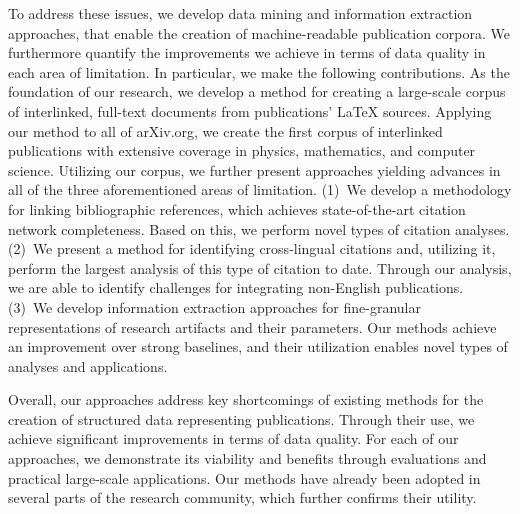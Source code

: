 To address these issues, we develop %
data mining and information extraction approaches, that enable the creation of machine-readable publication corpora.
We furthermore quantify the improvements we achieve in terms of data quality in each area of limitation.
%
In particular, we make the following contributions.
As the foundation of our research, we develop a method for creating a large-scale corpus of interlinked, full-text documents from publications' \LaTeX{} sources.
Applying our method to all of arXiv.org, we create the first corpus of interlinked publications with extensive %
coverage in physics, mathematics, and computer science.  %
Utilizing our corpus, we further present approaches yielding advances in all of the three aforementioned areas of limitation.
(1)~We develop a methodology for linking bibliographic references, which achieves state-of-the-art citation network completeness. Based on this, we perform novel types of citation analyses.
(2)~We present a method for identifying cross-lingual citations and, utilizing it, perform the largest analysis of this type of citation to date. Through our analysis, we are able to identify challenges for integrating non-English publications.
(3)~We develop information extraction approaches for fine-granular representations of research artifacts and their parameters.
Our methods achieve an improvement over strong baselines, and their utilization enables novel types of analyses and applications.


Overall, our approaches address key shortcomings of existing methods for the creation of structured data representing publications.
Through their use, we achieve significant improvements in terms of data quality.
For each of our approaches, we demonstrate its viability and benefits through evaluations and practical large-scale applications.
Our methods have already been adopted in several parts of the research community, which further confirms their utility.
